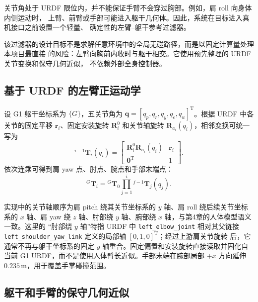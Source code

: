 关节角处于 URDF 限位内，并不能保证手臂不会穿过胸部。例如，肩 roll 向身体内侧运动时，
上臂、前臂或手部可能进入躯干几何体。因此，系统在目标进入真机接口之前设置一个轻量、
确定性的左臂--躯干参考过滤器。

该过滤器的设计目标不是求解任意环境中的全局无碰路径，而是以固定计算量处理本项目最直接
的风险：左臂向胸前内收时与躯干相交。它使用预先整理的 URDF 关节变换和保守几何近似，
不依赖外部全身控制器。

\subsection{基于 URDF 的左臂正运动学}
\label{subsec:ch5_g1_arm_forward_kinematics}

设 G1 躯干坐标系为 $\{G\}$，五关节角为
$\boldsymbol q=[q_p,q_r,q_y,q_e,q_w]^{\mathrm T}$。根据 URDF 中各关节的固定平移
$\boldsymbol r_i$、固定安装旋转 $\boldsymbol R_i^0$ 和关节轴旋转
$\boldsymbol R_{a_i}(q_i)$，相邻变换可统一写为
\begin{equation}
  {}^{i-1}\boldsymbol T_i(q_i)=
  \begin{bmatrix}
    \boldsymbol R_i^0\boldsymbol R_{a_i}(q_i)&\boldsymbol r_i\\
    \boldsymbol 0^{\mathrm T}&1
  \end{bmatrix}.
  \label{eq:ch5_g1_link_transform}
\end{equation}
依次连乘可得到肩 yaw 点、肘点、腕点和手部末端点：
\begin{equation}
  {}^G\boldsymbol T_i=
  {}^G\boldsymbol T_0
  \prod_{j=1}^{i}{}^{j-1}\boldsymbol T_j(q_j).
  \label{eq:ch5_g1_transform_chain}
\end{equation}

实现中的关节轴顺序为肩 pitch 绕其关节坐标系的 $y$ 轴、肩 roll 绕后续关节坐标系的 $x$
轴、肩 yaw 绕 $z$ 轴、肘部绕 $y$ 轴、腕部绕 $x$ 轴，与第4章的人体模型语义一致。这里的
“肘部绕 $y$ 轴”特指 URDF 中 \texttt{left\_elbow\_joint} 相对其父链接
\texttt{left\_shoulder\_yaw\_link} 定义的局部轴 $[0,1,0]^{\mathrm T}$；经过上游肩关节旋转
后，它通常不再与躯干坐标系的固定 $y$ 轴重合。固定偏置和安装旋转直接读取并固化自当前 G1
URDF，而不是使用人体臂长近似。手部末端在腕部局部 $+x$ 方向延伸
$0.235\,\mathrm m$，用于覆盖手掌碰撞范围。

\subsection{躯干和手臂的保守几何近似}
\label{subsec:ch5_collision_geometry}

